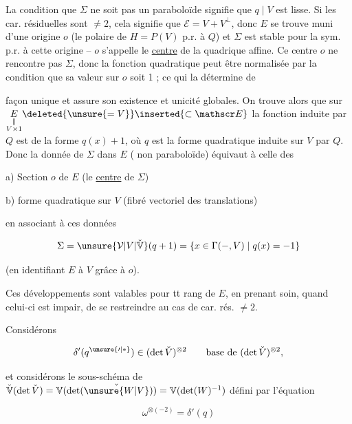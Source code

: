La condition que $\Sigma$ ne soit pas un paraboloïde signifie que $q\mid V$ est  lisse. Si les car. résiduelles sont $\ne2$, cela signifie  que $\mathscr E=V+V^\perp$, donc $E$ se trouve muni d'une origine $o$  (le polaire de $H=P(V)$ p.r. à  $Q$) et $\Sigma$ est stable pour la sym. p.r. à cette origine -- $o$ s'appelle le \uline{centre} de la quadrique affine. Ce centre $o$  ne rencontre pas $\Sigma$, donc la fonction quadratique peut être normalisée  par la condition que sa valeur sur $o$ soit 1 ; ce qui la détermine de


façon unique et assure son existence et unicité globales. On  trouve alors que sur $\underset{\substack{\Vert\\V\times1}}{E}\deleted{\unsure{=V}}\inserted{\subset\mathscr E}$ la fonction induite par $Q$ est de la forme $q(x)+1$, où $q$ est la forme quadratique  induite sur $V$ par $Q$. Donc la donnée de $\Sigma$ dans $E$ ( non paraboloïde) équivaut à celle des

a) Section $o$ de $E$ (le \uline{centre} de $\Sigma$)

b) forme quadratique  sur $V$ (fibré vectoriel des translations)

en associant à ces données

\[
\Sigma=\unsure{\mathcal V|V|\check{\mathbb V}}(q+1)=\{x\in\Gamma(-,V)\mid q(x)=-1\}
\]

(en identifiant $E$ à $V$ grâce à $o$).

Ces développements sont valables pour tt rang de $E$, en prenant soin, quand celui-ci est impair,  de se restreindre au cas de  car. rés. $\ne2$.

Considérons \deleted{\unsure{$\delta$}}

\[
\delta'(q^{\unsure{\prime|\ast}})\in(\det\check V)^{\otimes2}\qquad\text{base de }(\det\check V)^{\otimes2},
\]


et considérons le sous-schéma de $\check{\mathbb V}(\det\check V)=\mathbb V(\det(\check{\unsure{W|V}}))=\mathbb V(\det(W)^{-1})$ défini par l'équation

\[
\omega^{\otimes(-2)}=\delta'(q)
\]

